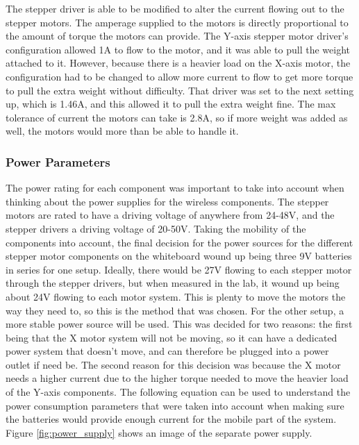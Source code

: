 The stepper driver is able to be modified to alter the current flowing out to the stepper motors. The amperage supplied to the motors is directly proportional to the amount of torque the motors can provide. The Y-axis stepper motor driver’s configuration allowed 1A to flow to the motor, and it was able to pull the weight attached to it. However, because there is a heavier load on the X-axis motor, the configuration had to be changed to allow more current to flow to get more torque to pull the extra weight without difficulty. That driver was set to the next setting up, which is 1.46A, and this allowed it to pull the extra weight fine. The max tolerance of current the motors can take is 2.8A, so if more weight was added as well, the motors would more than be able to handle it.

\subsubsection{Power Parameters}

The power rating for each component was important to take into account when thinking about the power supplies for the wireless components. The stepper motors are rated to have a driving voltage of anywhere from 24-48V, and the stepper drivers a driving voltage of 20-50V. Taking the mobility of the components into account, the final decision for the power sources for the different stepper motor components on the whiteboard wound up being three 9V batteries in series for one setup. Ideally, there would be 27V flowing to each stepper motor through the stepper drivers, but when measured in the lab, it wound up being about 24V flowing to each motor system. This is plenty to move the motors the way they need to, so this is the method that was chosen. For the other setup, a more stable power source will be used. This was decided for two reasons: the first being that the X motor system will not be moving, so it can have a dedicated power system that doesn’t move, and can therefore be plugged into a power outlet if need be. The second reason for this decision was because the X motor needs a higher current due to the higher torque needed to move the heavier load of the Y-axis components. The following equation can be used to understand the power consumption parameters that were taken into account when making sure the batteries would provide enough current for the mobile part of the system. Figure \ref{fig:power_supply} shows an image of the separate power supply.\\

